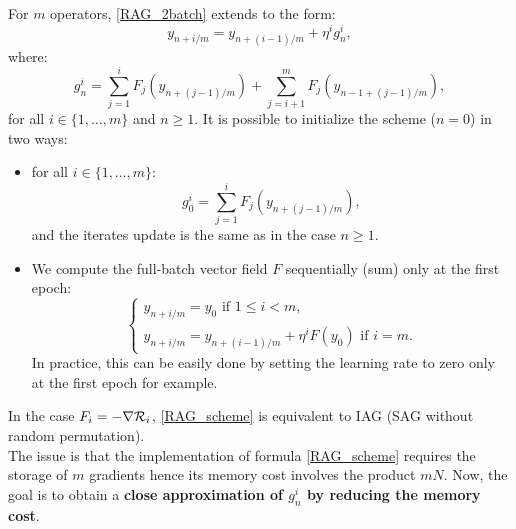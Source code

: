 For $m$ operators, \eqref{RAG_2batch} extends to the form:
\begin{equation}
	y_{n+i/m} = y_{n+(i-1)/m}+\eta^i g_n^i,
	\label{RAG_scheme}
\end{equation}
where:
\begin{equation}
	g_n^i = \sum_{j=1}^i F_j\left(y_{n+(j-1)/m}\right)+\sum_{j=i+1}^m F_j\left(y_{n-1+(j-1)/m}\right),
	\label{gni}
\end{equation}
for all $i \in \{1,\dots,m\}$ and $n\geq 1$. It is possible to initialize the scheme ($n=0$) in two ways:
\begin{itemize}
	\item for all $i\in \{1,\dots,m\}$:
	\begin{equation*}
		g_0^i = \sum_{j=1}^i F_j\left(y_{n+(j-1)/m}\right),
	\end{equation*}
	and the iterates update is the same as in the case $n\geq 1$.
	\item We compute the full-batch vector field $F$ sequentially (sum) only at the first epoch:
	\begin{equation*}
		\left\{
		\begin{array}{ll}
			y_{n+i/m}=y_0 \text{ if } 1\leq i<m, \\
			y_{n+i/m} = y_{n+(i-1)/m}+\eta^i F(y_0) \text{ if } i=m.
		\end{array}
		\right.
	\end{equation*}
        In practice, this can be easily done by setting the learning rate to zero only at the first epoch for example. 
\end{itemize}
In the case $F_i=-\nabla \mathcal{R}_i$, \eqref{RAG_scheme} is equivalent to IAG (SAG without random permutation). \\
The issue is that the implementation of formula \eqref{RAG_scheme} requires the storage of $m$ gradients hence its memory cost involves the product $mN$. Now, the goal is to obtain a \textbf{close approximation of $g_n^i$ by reducing the memory cost}.

